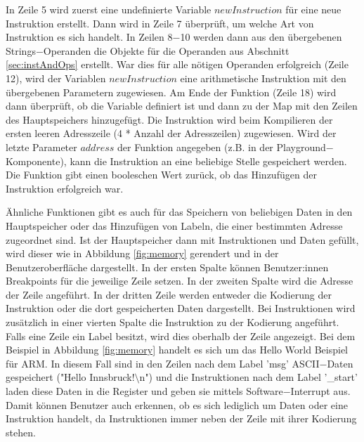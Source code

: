 \documentclass[a4paper, 11pt, onecolumn]{article}
\begin{document}
In Zeile 5 wird zuerst eine undefinierte Variable $newInstruction$ für eine neue Instruktion erstellt. Dann wird in Zeile 7 überprüft, um welche Art von Instruktion es sich handelt. In Zeilen 8$-$10 werden dann aus den übergebenen Strings$-$Operanden die Objekte für die Operanden aus Abschnitt \ref{sec:instAndOps} erstellt. War dies für alle nötigen Operanden erfolgreich (Zeile 12), wird der Variablen $newInstruction$ eine arithmetische Instruktion mit den übergebenen Parametern zugewiesen. Am Ende der Funktion (Zeile 18) wird dann überprüft, ob die Variable definiert ist und dann zu der Map mit den Zeilen des Hauptspeichers hinzugefügt. Die Instruktion wird beim Kompilieren der ersten leeren Adresszeile (4 * Anzahl der Adresszeilen) zugewiesen. Wird der letzte Parameter $address$ der Funktion angegeben (z.B. in der Playground$-$Komponente), kann die Instruktion an eine beliebige Stelle gespeichert werden. Die Funktion gibt einen booleschen Wert zurück, ob das Hinzufügen der Instruktion erfolgreich war.

Ähnliche Funktionen gibt es auch für das Speichern von beliebigen Daten in den Hauptspeicher oder das Hinzufügen von Labeln, die einer bestimmten Adresse zugeordnet sind. Ist der Hauptspeicher dann mit Instruktionen und Daten gefüllt, wird dieser wie in Abbildung \ref{fig:memory} gerendert und in der Benutzeroberfläche dargestellt. In der ersten Spalte können Benutzer:innen Breakpoints für die jeweilige Zeile setzen. In der zweiten Spalte wird die Adresse der Zeile angeführt. In der dritten Zeile werden entweder die Kodierung der Instruktion oder die dort gespeicherten Daten dargestellt. Bei Instruktionen wird zusätzlich in einer vierten Spalte die Instruktion zu der Kodierung angeführt. Falls eine Zeile ein Label besitzt, wird dies oberhalb der Zeile angezeigt. Bei dem Beispiel in Abbildung \ref{fig:memory} handelt es sich um das Hello World Beispiel für ARM. In diesem Fall sind in den Zeilen nach dem Label 'msg' ASCII$-$Daten gespeichert ("Hello Innsbruck!$\setminus$n") und die Instruktionen nach dem Label '\_start' laden diese Daten in die Register und geben sie mittels Software$-$Interrupt aus. Damit können Benutzer auch erkennen, ob es sich lediglich um Daten oder eine Instruktion handelt, da Instruktionen immer neben der Zeile mit ihrer Kodierung stehen.
\end{document}
